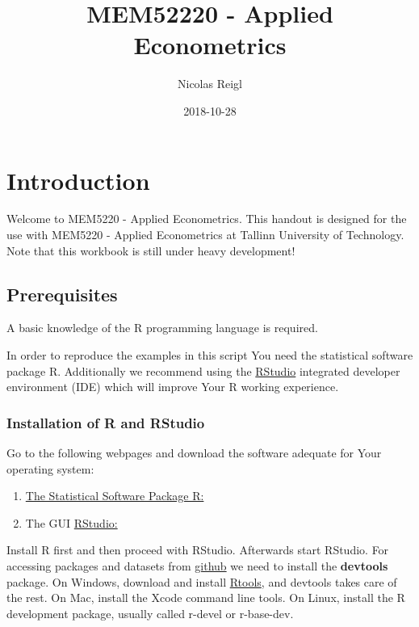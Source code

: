 \documentclass[]{book}
\title{MEM52220 - Applied Econometrics}
\author{Nicolas Reigl}
\date{2018-10-28}
\providecommand{\tightlist}{%
  \setlength{\itemsep}{0pt}\setlength{\parskip}{0pt}}
\begin{document}
\maketitle

{
\setcounter{tocdepth}{1}
\tableofcontents
}
\hypertarget{introduction}{%
\chapter*{Introduction}\label{introduction}}

Welcome to MEM5220 - Applied Econometrics. This handout is designed for
the use with MEM5220 - Applied Econometrics at Tallinn University of
Technology. Note that this workbook is still under heavy development!

\hypertarget{prerequisites}{%
\section*{Prerequisites}\label{prerequisites}}

A basic knowledge of the R \citep{team2013r} programming language is
required.

In order to reproduce the examples in this script You need the
statistical software package R. Additionally we recommend using the
\href{https://www.rstudio.com}{RStudio} integrated developer environment
(IDE) which will improve Your R working experience.

\hypertarget{installation-of-r-and-rstudio}{%
\subsection*{Installation of R and
RStudio}\label{installation-of-r-and-rstudio}}

Go to the following webpages and download the software adequate for Your
operating system:

\begin{enumerate}
\def\labelenumi{\arabic{enumi}.}
\tightlist
\item
  \href{http://cran.r-project.org}{The Statistical Software Package R:}
\item
  The GUI \href{https://www.rstudio.com}{RStudio:}
\end{enumerate}

Install R first and then proceed with RStudio. Afterwards start RStudio.
For accessing packages and datasets from
\href{https://github.com/}{github} we need to install the
\textbf{devtools} package. On Windows, download and install
\href{https://cran.r-project.org/bin/windows/Rtools/}{Rtools}, and
devtools takes care of the rest. On Mac, install the Xcode command line
tools. On Linux, install the R development package, usually called
r-devel or r-base-dev.
\end{document}
